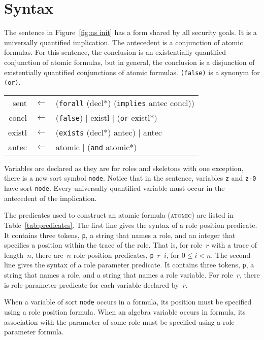 \documentclass[12pt]{article}
\newcommand{\sym}[1]{\textup{\texttt{#1}}}
\begin{document}
\section{Syntax}\label{sec:syntax}

The sentence in Figure~\ref{fig:ns init} has a form shared by all
security goals.  It is a universally quantified implication.  The
antecedent is a conjunction of atomic formulas.  For this sentence,
the conclusion is an existentially quantified conjunction of atomic
formulas, but in general, the conclusion is a disjunction of
existentially quantified conjunctions of atomic formulas.
\sym{(false)} is a synonym for \sym{(or)}.

\begin{center}\scshape
  \begin{tabular}{rcl}
  sent&$\leftarrow$&(\sym{forall} (decl$\ast$) (\sym{implies} antec concl))
  \\ concl&$\leftarrow$&(\sym{false})
  $\mid$ existl $\mid$ (\sym{or} existl$\ast)$
  \\ existl&$\leftarrow$&(\sym{exists}
  (decl$\ast$) antec) $\mid$ antec
  \\ antec&$\leftarrow$&atomic $\mid$ (\sym{and} atomic$\ast$)
  \end{tabular}
\end{center}

Variables are declared as they are for roles and skeletons with one
exception, there is a new sort symbol \sym{node}.  Notice that in the
sentence, variables \sym{z} and \sym{z-0} have sort \sym{node}.  Every
universally quantified variable must occur in the antecedent of the
implication.

The predicates used to construct an atomic formula (\textsc{atomic})
are listed in Table~\ref{tab:predicates}.  The first line gives the
syntax of a role position predicate.  It contains three tokens,
\texttt{p}, a string that names a role, and an integer that specifies
a position within the trace of the role.  That is, for role~$r$ with a
trace of length~$n$, there are~$n$ role position predicates,
\mbox{\texttt{p} $r$ $i$}, for $0\leq i < n$.  The second line gives
the syntax of a role parameter predicate.  It contains three tokens,
\texttt{p}, a string that names a role, and a string that names a role
variable.  For role~$r$, there is role parameter predicate for each
variable declared by~$r$.

When a variable of sort \sym{node} occurs in a formula, its position
must be specified using a role position formula.  When an algebra
variable occurs in formula, its association with the parameter of some
role must be specified using a role parameter formula.
\end{document}
